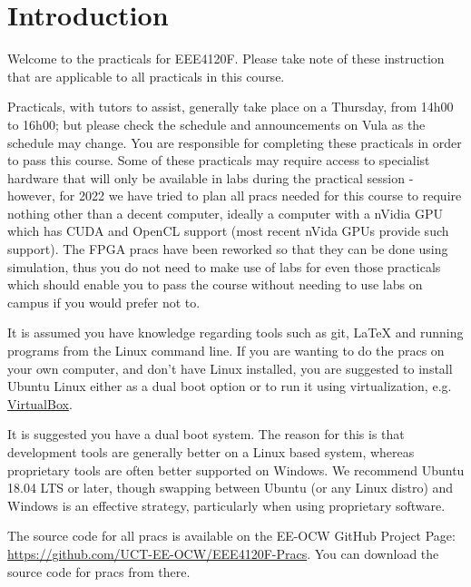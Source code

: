 \section*{Introduction}
Welcome to the practicals for EEE4120F. Please take note of these instruction that are applicable to all practicals in this course.

Practicals, with tutors to assist, generally take place on a Thursday, from 14h00 to 16h00; but please check the schedule and announcements on Vula as the schedule may change. You are responsible for completing these practicals in order to pass this course. Some of these practicals may require access to specialist hardware that will only be available in labs during the practical session - however, for 2022 we have tried to plan all pracs needed for this course to require nothing other than a decent computer, ideally a computer with a nVidia GPU which has CUDA and OpenCL support (most recent nVida GPUs provide such support). The FPGA pracs have been reworked so that they can be done using simulation, thus you do not need to make use of labs for even those practicals which should enable you to pass the course without needing to use labs on campus if you would prefer not to.

It is assumed you have knowledge regarding tools such as git, \LaTeX{} and running programs from the Linux command line. If you are wanting to do the pracs on your own computer, and don't have Linux installed, you are suggested to install Ubuntu Linux either as a dual boot option or to run it using virtualization, e.g. \href{https://www.virtualbox.org/}{VirtualBox}.

It is suggested you have a dual boot system. The reason for this is that development tools are generally better on a Linux based system, whereas proprietary tools are often better supported on Windows. We recommend Ubuntu 18.04 LTS or later, though swapping between Ubuntu (or any Linux distro) and Windows is an effective strategy, particularly when using proprietary software.

The source code for all pracs is available on the EE-OCW GitHub Project Page: \href{https://github.com/UCT-EE-OCW/EEE4120F-Pracs}{https://github.com/UCT-EE-OCW/EEE4120F-Pracs}. You can download the source code for pracs from there.